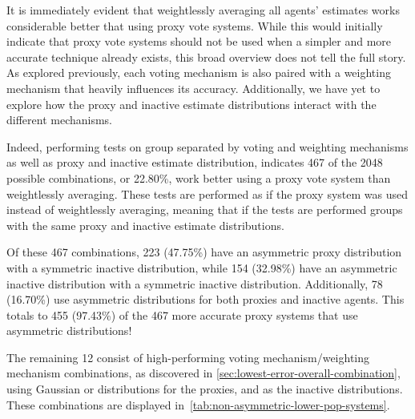 It is immediately evident that weightlessly averaging all agents' estimates works
considerable better that using proxy vote systems.
While this would initially indicate that proxy vote systems should not be used when a
simpler and more accurate technique already exists, this broad overview does not tell
the full story.
As explored previously, each voting mechanism is also paired with a weighting
mechanism that heavily influences its accuracy.
Additionally, we have yet to explore how the proxy and inactive estimate
distributions interact with the different mechanisms.

Indeed, performing tests on group separated by voting and weighting mechanisms as
well as proxy and inactive estimate distribution, indicates 467 of the 2048 possible
combinations, or 22.80\%, work better using a proxy vote system than weightlessly
averaging.
These tests are performed as if the proxy system was used instead of weightlessly
averaging, meaning that if the tests are performed groups with the same proxy and
inactive estimate distributions.

Of these 467 combinations, 223 (47.75\%) have an asymmetric proxy distribution with
a symmetric inactive distribution, while 154 (32.98\%) have an asymmetric inactive
distribution with a symmetric inactive distribution.
Additionally, 78 (16.70\%) use asymmetric distributions for both proxies and
inactive agents.
This totals to 455 (97.43\%) of the 467 more accurate proxy systems that use
asymmetric distributions!

The remaining 12 consist of high-performing voting mechanism/weighting mechanism
combinations, as discovered in \autoref{sec:lowest-error-overall-combination},
using Gaussian or  distributions for the proxies,
and  as the inactive distributions.
These combinations are displayed in~\autoref{tab:non-asymmetric-lower-pop-systems}.

